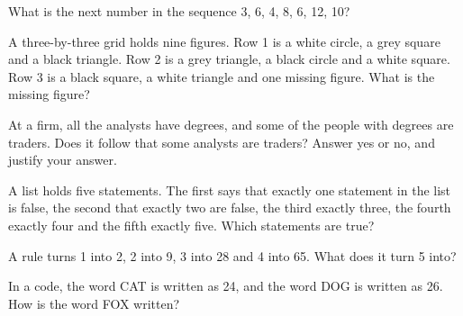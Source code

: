 \begin{question}\label{iq:iv1:sequences-patterns-and-aptitude:7}
What is the next number in the sequence 3, 6, 4, 8, 6, 12, 10?
\end{question}

\begin{question}\label{iq:iv1:sequences-patterns-and-aptitude:8}
A three-by-three grid holds nine figures. Row 1 is a white circle, a grey square and a black triangle. Row 2 is a grey triangle, a black circle and a white square. Row 3 is a black square, a white triangle and one missing figure. What is the missing figure?
\end{question}

\begin{question}\label{iq:iv1:sequences-patterns-and-aptitude:9}
At a firm, all the analysts have degrees, and some of the people with degrees are traders. Does it follow that some analysts are traders? Answer yes or no, and justify your answer.
\end{question}

\begin{question}\label{iq:iv1:sequences-patterns-and-aptitude:10}
A list holds five statements. The first says that exactly one statement in the list is false, the second that exactly two are false, the third exactly three, the fourth exactly four and the fifth exactly five. Which statements are true?
\end{question}

\begin{question}\label{iq:iv1:sequences-patterns-and-aptitude:11}
A rule turns 1 into 2, 2 into 9, 3 into 28 and 4 into 65. What does it turn 5 into?
\end{question}

\begin{question}\label{iq:iv1:sequences-patterns-and-aptitude:12}
In a code, the word CAT is written as 24, and the word DOG is written as 26. How is the word FOX written?
\end{question}

